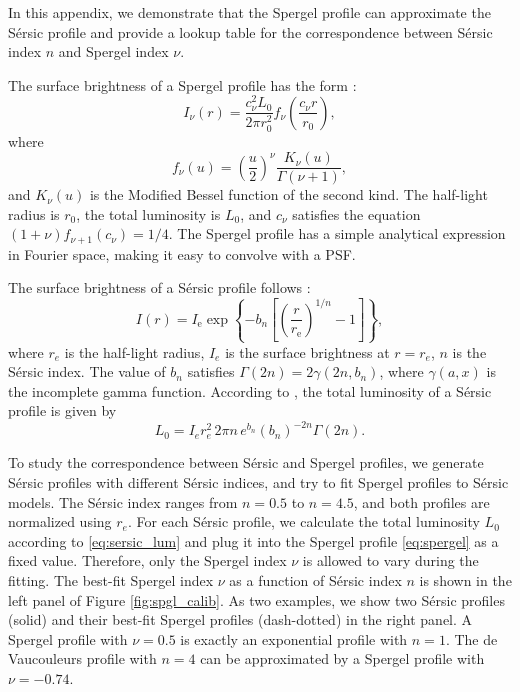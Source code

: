 \documentclass[twocolumn,astrosymb,twocolappendix]{aastex631}
\newcommand{\sersic}{S\'ersic}
\begin{document}
\begin{CJK*}{UTF8}{gbsn}
In this appendix, we demonstrate that the Spergel profile can approximate the \sersic{} profile and provide a lookup table for the correspondence between \sersic{} index $n$ and Spergel index $\nu$.

The surface brightness of a Spergel profile has the form \citep{Spergel2010}:
\begin{equation}
    \label{eq:spergel}
    I_\nu(r) = \frac{c_{\nu}^{2} L_{0}}{2\pi r_{0}^{2}} f_{\nu}\left(\frac{c_{\nu} r}{r_{0}}\right),
\end{equation}
where 
\begin{equation}
    f_{\nu}(u)=\left(\frac{u}{2}\right)^{\nu} \frac{K_{\nu}(u)}{\Gamma(\nu+1)},
\end{equation}
and $K_\nu(u)$ is the Modified Bessel function of the second kind. The half-light radius is $r_0$, the total luminosity is $L_0$, and $c_\nu$ satisfies the equation $(1 + \nu)f_{\nu + 1}(c_\nu) = 1/4$. The Spergel profile has a simple analytical expression in Fourier space, making it easy to convolve with a PSF.

The surface brightness of a \sersic{} profile follows \citep{Sersic1963,Graham2005}:
\begin{equation}\label{eq:sersic}
    I(r)=I_{\mathrm{e}} \exp \left\{-b_{n}\left[\left(\frac{r}{r_{\mathrm{e}}}\right)^{1 / n}-1\right]\right\},
\end{equation}
where $r_e$ is the half-light radius, $I_e$ is the surface brightness at $r=r_e$, $n$ is the \sersic{} index. The value of $b_n$ satisfies $\Gamma(2 n)=2 \gamma\left(2 n, b_{n}\right)$, where $\gamma(a, x)$ is the incomplete gamma function. According to \citet{Graham2005}, the total luminosity of a \sersic{} profile is given by 
\begin{equation}\label{eq:sersic_lum}
    L_0 = I_{e} r_{e}^{2}\, 2 \pi n\, e^{b_{n}} \left(b_{n}\right)^{-2 n} \Gamma(2 n).
\end{equation}

To study the correspondence between \sersic{} and Spergel profiles, we generate \sersic{} profiles with different \sersic{} indices, and try to fit Spergel profiles to \sersic{} models. The \sersic{} index ranges from $n=0.5$ to $n=4.5$, and both profiles are normalized using $r_e$. For each \sersic{} profile, we calculate the total luminosity $L_0$ according to \eqref{eq:sersic_lum} and plug it into the Spergel profile \eqref{eq:spergel} as a fixed value. Therefore, only the Spergel index $\nu$ is allowed to vary during the fitting. The best-fit Spergel index $\nu$ as a function of \sersic{} index $n$ is shown in the left panel of Figure \ref{fig:spgl_calib}. As two examples, we show two \sersic{} profiles (solid) and their best-fit Spergel profiles (dash-dotted) in the right panel. A Spergel profile with $\nu=0.5$ is exactly an exponential profile with $n=1$. The de Vaucouleurs profile \citep{deVaucouleurs1948} with $n=4$ can be approximated by a Spergel profile with $\nu=-0.74$. 


\end{CJK*}
\end{document}
